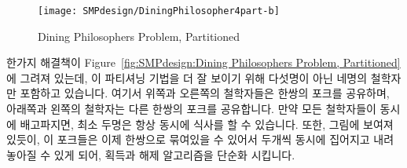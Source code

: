 \fi

\begin{figure}[tb]
\centering
\texttt{[image: SMPdesign/DiningPhilosopher4part-b]}
\caption{Dining Philosophers Problem, Partitioned}
\end{figure}

한가지 해결책이
Figure~\ref{fig:SMPdesign:Dining Philosophers Problem, Partitioned}
에 그려져 있는데, 이 파티셔닝 기법을 더 잘 보이기 위해 다섯명이 아닌 네명의
철학자만 포함하고 있습니다.
여기서 위쪽과 오른쪽의 철학자들은 한쌍의 포크를 공유하며, 아래쪽과 왼쪽의
철학자는 다른 한쌍의 포크를 공유합니다.
만약 모든 철학자들이 동시에 배고파지면, 최소 두명은 항상 동시에 식사를 할 수
있습니다.
또한, 그림에 보여져 있듯이, 이 포크들은 이제 한쌍으로 묶여있을 수 있어서 두개씩
동시에 집어지고 내려놓아질 수 있게 되어, 획득과 해제 알고리즘을 단순화
시킵니다.

